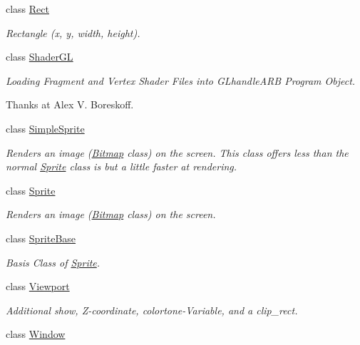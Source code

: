 \begin{DoxyCompactItemize}
class \hyperlink{class_f2_c_1_1_rect}{Rect}
\begin{DoxyCompactList}\small\item\em Rectangle (x, y, width, height). \item\end{DoxyCompactList}\item 
class \hyperlink{class_f2_c_1_1_shader_g_l}{ShaderGL}
\begin{DoxyCompactList}\small\item\em Loading Fragment and Vertex Shader Files into GLhandleARB Program Object. \par
 \par
 Thanks at Alex V. Boreskoff. \item\end{DoxyCompactList}\item 
class \hyperlink{class_f2_c_1_1_simple_sprite}{SimpleSprite}
\begin{DoxyCompactList}\small\item\em Renders an image (\hyperlink{class_f2_c_1_1_bitmap}{Bitmap} class) on the screen. This class offers less than the normal \hyperlink{class_f2_c_1_1_sprite}{Sprite} class is but a little faster at rendering. \item\end{DoxyCompactList}\item 
class \hyperlink{class_f2_c_1_1_sprite}{Sprite}
\begin{DoxyCompactList}\small\item\em Renders an image (\hyperlink{class_f2_c_1_1_bitmap}{Bitmap} class) on the screen. \item\end{DoxyCompactList}\item 
class \hyperlink{class_f2_c_1_1_sprite_base}{SpriteBase}
\begin{DoxyCompactList}\small\item\em Basis Class of \hyperlink{class_f2_c_1_1_sprite}{Sprite}. \item\end{DoxyCompactList}\item 
class \hyperlink{class_f2_c_1_1_viewport}{Viewport}
\begin{DoxyCompactList}\small\item\em Additional show, Z-\/coordinate, colortone-\/Variable, and a clip\_\-rect. \item\end{DoxyCompactList}\item 
class \hyperlink{class_f2_c_1_1_window}{Window}

\end{DoxyCompactItemize}
